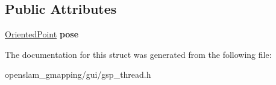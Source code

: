 \subsection*{Public Attributes}
\begin{DoxyCompactItemize}
\item 
\mbox{\label{structGridSlamProcessorThread_1_1TruePosEvent_a5f0951b5dbcac0d03b5fcab7198fb459}} 
\hyperlink{structGMapping_1_1orientedpoint}{Oriented\+Point} {\bfseries pose}
\end{DoxyCompactItemize}


The documentation for this struct was generated from the following file\+:\begin{DoxyCompactItemize}
\item 
openslam\+\_\+gmapping/gui/gsp\+\_\+thread.\+h\end{DoxyCompactItemize}
